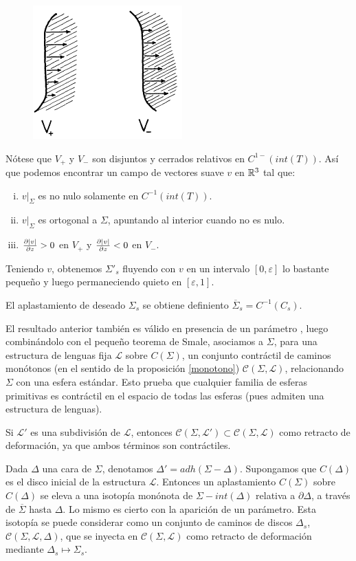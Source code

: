 \documentclass[twoside, 11pt]{article}
\begin{document}
\begin{dem}
\begin{figure}[h!]
\includegraphics[scale=0.7]{vectores}
\end{figure}


 Nótese que $V_+$ y $V_-$ son disjuntos y cerrados relativos en $C^{1-}(int(T))$. Así que podemos encontrar un campo de vectores suave $v$ en $\mathbb{R}^3$ tal que:
\begin{enumerate}[i)]
\item $v|_{\Sigma}$ es no nulo solamente en $C^{-1}(int(T))$.
\item $v|_{\Sigma}$ es ortogonal a $\Sigma$, apuntando al interior cuando no es nulo. 
\item $\frac{\partial |v|}{\partial z}>0$ en $V_+$ y $\frac{\partial |v|}{\partial z}<0$ en $V_-$.
\end{enumerate}
Teniendo $v$, obtenemos $\Sigma'_s$ fluyendo con $v$ en un intervalo $[0,\varepsilon]$ lo bastante pequeño y luego permaneciendo quieto en $[\varepsilon,1]$. 

El aplastamiento de deseado $\Sigma_s$ se obtiene definiento $\overline{\Sigma}_s=C^{-1}(C_s)$.
\QED
\end{dem}

El resultado anterior también es válido en presencia de un parámetro \cite[Lema 6.1]{Ha}, luego combinándolo con el pequeño teorema de Smale, asociamos a $\Sigma$, para una estructura de lenguas fija $\mathcal{L}$ sobre $C(\Sigma)$, un conjunto contráctil de caminos monótonos (en el sentido de la proposición \ref{monotono}) $\mathcal{C}(\Sigma,\mathcal{L})$, relacionando $\Sigma$ con una esfera estándar. Esto prueba que cualquier familia de esferas primitivas es contráctil en el espacio de todas las esferas (pues admiten una estructura de lenguas). 

Si $\mathcal{L}'$ es una subdivisión de $\mathcal{L}$, entonces $\mathcal{C}(\Sigma,\mathcal{L}')\subset\mathcal{C}(\Sigma,\mathcal{L})$ como retracto de deformación, ya que ambos términos son contráctiles. 

Dada $\Delta$ una cara de $\Sigma$, denotamos $\Delta'=adh(\Sigma-\Delta)$. Supongamos que $C(\Delta)$ es el disco inicial de la estructura $\mathcal{L}$. Entonces un aplastamiento $C(\Sigma)$ sobre $C(\Delta)$ se eleva a una isotopía monónota de $\Sigma-int(\Delta)$ relativa a $\partial \Delta$, a través de $\overline{\Sigma}$ hasta $\Delta$. Lo mismo es cierto con la aparición de un parámetro. Esta isotopía se puede considerar como un conjunto de caminos de discos $\Delta_s$, $\mathcal{C}(\Sigma,\mathcal{L},\Delta)$, que se inyecta en $\mathcal{C}(\Sigma,\mathcal{L})$ como retracto de deformación mediante $\Delta_s\mapsto \Sigma_s$.
\end{document}
